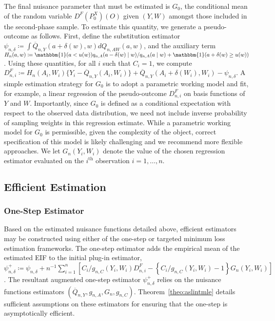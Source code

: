 The final nuisance parameter that must be estimated is $G_0$, the conditional
mean of the random variable $D^F(P_0^X)(O)$ given $(Y,W)$ amongst those included
in the second-phase sample. To estimate this quantity, we generate
a pseudo-outcome as follows. First, define the substitution estimator
$\psi_{n,\delta} \coloneqq \int \overline{Q}_{n,Y}(a + \delta(w), w)
dQ_{n,AW}(a,w)$, and the auxiliary term $H_n(a,w) \coloneqq \mathbbm{1}(a <
u(w)) q_{n,A}(a - \delta(w) \mid w)/q_{n,A}(a \mid w) + \mathbbm{1}(a +
\delta(w) \ge u(w))$.
Using these quantities, for all $i$ such that $C_i = 1$, we compute $D^F_{n,i}
\coloneqq H_n(A_i, W_i) \{Y_i - \overline{Q}_{n,Y}(A_i, W_i)\}
+ \overline{Q}_{n,Y}(A_i + \delta(W_i), W_i) - \psi_{n,\delta}$.
A simple estimation strategy for $G_0$ is to adopt a parametric working model
and fit, for example, a linear regression of the pseudo-outcome $D^F_{n,i}$ on
basis functions of $Y$ and $W$. Importantly, since $G_0$ is defined as
a conditional expectation with respect to the observed data distribution, we
need not include inverse probability of sampling weights in this regression
estimate. While a parametric working model for $G_0$ is permissible, given the
complexity of the object, correct specification of this model is likely
challenging and we recommend more flexible approaches. We let $G_n(Y_i,W_i)$
denote the value of the chosen regression estimator evaluated on the
$i^\text{th}$ observation $i = 1, \ldots, n$.

\subsection{Efficient Estimation}\label{os_tml_est}

\subsubsection{One-Step Estimator}

Based on the estimated nuisance functions detailed above, efficient estimators
may be constructed using either of the one-step or targeted minimum loss
estimation frameworks. The one-step estimator adds the empirical mean of the
estimated EIF to the initial plug-in estimator, $\psi_{n,\delta}^{+} \coloneqq
\psi_{n,\delta} + n^{-1} \sum_{i=1}^n \left[C_i/g_{n,C}(Y_i,W_i) D^F_{n,i} -
\left\{C_i/g_{n,C}(Y_i,W_i) - 1\right\} G_n(Y_i,W_i) \right]$.
The resultant augmented one-step estimator $\psi_{n,\delta}^{+}$ relies on the
nuisance functions estimators $(\overline{Q}_{n,Y}, g_{n,A}, G_n, g_{n,C})$.
Theorem~\ref{theo:aslintmle} details sufficient assumptions on these estimators
for ensuring that the one-step is asymptotically efficient.

